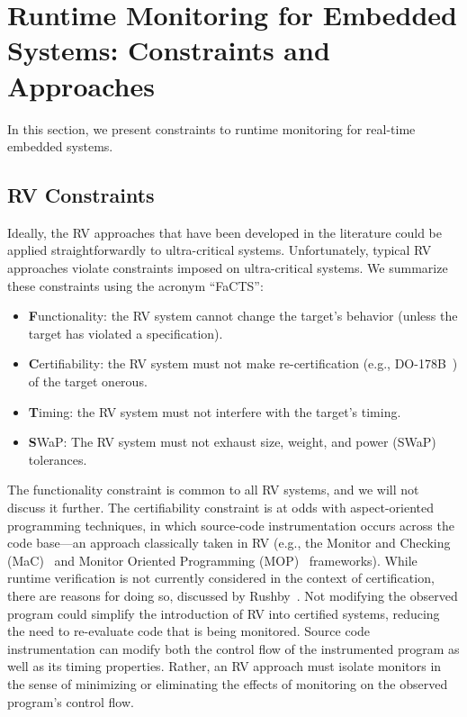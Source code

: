 \section{Runtime Monitoring for Embedded Systems: Constraints and Approaches}
\label{sec:constraintsApproaches}
In this section, we  present constraints to runtime monitoring for
real-time embedded systems. 

\subsection{RV Constraints}\label{sec:constraints}

Ideally, the RV approaches that have been developed in the literature could be
applied straightforwardly to ultra-critical systems.  Unfortunately,
typical RV approaches violate constraints imposed on ultra-critical
systems. We summarize these
constraints using the acronym ``FaCTS'':

\begin{itemize}
\item {\bf F}unctionality: the RV system cannot change the target's behavior (unless the
  target has violated a specification).
\item {\bf C}ertifiability: the RV system must not make re-certification (e.g.,
  DO-178B~\cite{DO178B}) of the target onerous.
\item {\bf T}iming: the RV system must not interfere with the target's timing.
\item {\bf S}WaP: The RV system must not exhaust size, weight, and power (SWaP)
  tolerances.
\end{itemize}

The functionality constraint is common to all RV systems, and we will not
discuss it further.  The certifiability constraint is at odds with
aspect-oriented programming techniques, in which source-code instrumentation
occurs across the code base---an approach classically taken in RV (e.g., the
Monitor and Checking (MaC)~\cite{KimVBKLS99} and Monitor Oriented Programming
(MOP)~\cite{ChenR05} frameworks).  While runtime verification is not currently
considered in the context of certification, there are reasons for doing so,
discussed by Rushby~\cite{rushbyrv}.  Not modifying the observed program could
simplify the introduction of RV into certified systems, reducing the need to
re-evaluate code that is being monitored.  Source code instrumentation can
modify both the control flow of the instrumented program as well as its timing
properties.  Rather, an RV approach must isolate monitors in the sense of
minimizing or eliminating the effects of monitoring on the observed program's
control flow.

